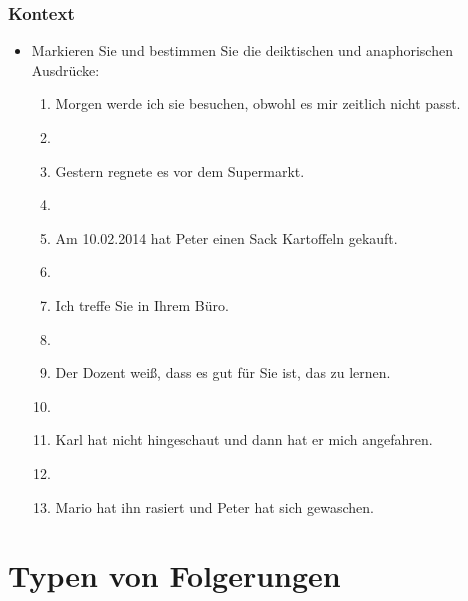 \begin{frame}
\frametitle{Kontext}

\begin{itemize}
	\item Markieren Sie und bestimmen Sie die deiktischen und anaphorischen Ausdrücke:
	
\vspace{5mm}

	\begin{enumerate}
		\item Morgen werde ich sie besuchen, obwohl es mir zeitlich nicht passt.
		\item[]
		\item Gestern regnete es vor dem Supermarkt.
		\item[]
		\item Am 10.02.2014 hat Peter einen Sack Kartoffeln gekauft.
		\item[]
		\item Ich treffe Sie in Ihrem Büro.
		\item[]
		\item Der Dozent wei\ss{}, dass es gut für Sie ist, das zu lernen.
		\item[]
		\item Karl hat nicht hingeschaut und dann hat er mich angefahren.
		\item[]
		\item Mario hat ihn rasiert und Peter hat sich gewaschen.
	\end{enumerate}
	
\end{itemize}

\end{frame}

%
\section{Typen von Folgerungen}
%

